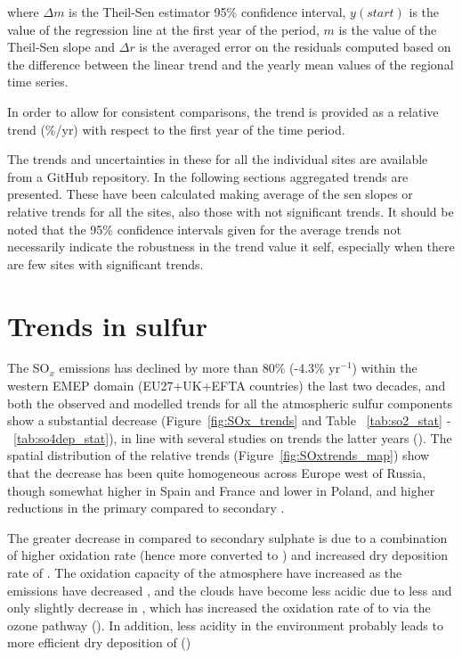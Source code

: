 where $\Delta m$ is the Theil-Sen estimator 95\% confidence interval, $y(start)$ is the value of the regression line at the first year of the period, $m$ is the value of the Theil-Sen slope and $\Delta r$ is the averaged error on the residuals computed based on the difference between the linear trend and the yearly mean values of the regional time series.

In order to allow for consistent comparisons, the trend is provided as a relative trend (\%/yr) with respect to the first year of the time period.

The trends and uncertainties in these for all the individual sites are available from a GitHub repository. In the following sections aggregated trends are presented. These have been calculated making average of the sen slopes or relative trends for all the sites, also those with not significant trends. It should be noted that the 95\% confidence intervals given for the average trends not necessarily indicate the robustness in the trend value it self, especially when there are few sites with significant trends.

\section{\label{sec:Trends_sulfur}Trends in sulfur}

The SO$_x$ emissions has declined by more than 80\% (-4.3\% yr$^{-1}$) within the western EMEP domain (EU27+UK+EFTA countries) the last two decades, and both the observed and modelled trends for all the atmospheric sulfur components show a substantial decrease (Figure~\ref{fig:SOx_trends} and Table ~\ref{tab:so2_stat} - ~\ref{tab:so4dep_stat}), in line with several studies on trends the latter years (\cite{aas2019global, Colette2012, Vivanco2018, Theobald2019, Colette2021, Banzhaf2015, torseth2012, Crippa2016}). The spatial distribution of the relative trends (Figure~\ref{fig:SOxtrends_map}) show that the decrease has been quite homogeneous across Europe west of Russia, though somewhat higher in Spain and France and lower in Poland, and higher reductions in the primary \soii compared to  secondary \soiv.

The  greater decrease in \soii compared to secondary sulphate is due to a combination of higher oxidation rate (hence more \soii converted to \soiv) and increased dry deposition rate of \soii. The oxidation capacity of the atmosphere have increased as the emissions have decreased \cite{Dalsoren2016}, and the clouds have become less acidic due to less \soii and only slightly decrease in \nhiii, which has increased the oxidation rate of \soii to \soiv via the ozone pathway (\cite{Banzhaf2015, Redington2009}). In addition, less acidity in the environment probably leads to more efficient dry deposition of \soii (\cite{Fowler_et_al:2009}) 

